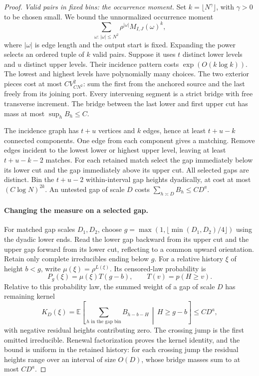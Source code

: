 \begin{proof}
\textit{Valid pairs in fixed bins: the occurrence moment.}
Set $k=\lfloor N^\gamma\rfloor$, with $\gamma>0$ to be chosen small.
We bound the unnormalized occurrence moment
\[
 \sum_{\omega:\,|\omega|\le N^2}
       \rho^{|\omega|}M_{I,J}(\omega)^k,
\]
where $|\omega|$ is edge length and the output start is fixed. Expanding
the power selects an ordered tuple of $k$ valid pairs. Suppose it uses
$t$ distinct lower levels and $u$ distinct upper levels. Their incidence
pattern costs $\exp(O(k\log k))$. The lowest and highest levels have
polynomially many choices. The two exterior pieces cost at most
$CV_{CN^2}^2$: sum the first from the anchored source and the last freely
from its joining port. Every intervening segment is a strict bridge with
free transverse increment. The bridge between the last lower and first
upper cut has mass at most $\sup_h B_h\le C$.

The incidence graph has $t+u$ vertices and $k$ edges, hence at least
$t+u-k$ connected components. One edge from each component gives a
matching. Remove edges incident to the lowest lower or highest upper
level, leaving at least $t+u-k-2$ matches. For each retained match select
the gap immediately below its lower cut and the gap immediately above
its upper cut. All selected gaps are distinct. Bin the $t+u-2$
within-interval gap heights dyadically, at cost at most
$(C\log N)^{2k}$. An untested gap of scale $D$ costs
$\sum_{h\asymp D}B_h\le CD^a$.

\paragraph{Changing the measure on a selected gap.}
For matched gap scales $D_1,D_2$, choose
$g=\max(1,\lfloor\min(D_1,D_2)/4\rfloor)$ using the dyadic lower
ends. Read the lower gap backward from its upper cut and the upper gap
forward from its lower cut, reflecting to a common upward orientation.
Retain only complete irreducibles ending below $g$. For a relative
history $\xi$ of height $b<g$, write $\mu(\xi)=\rho^{L(\xi)}$.
Its censored-law probability is
\[
 P_g(\xi)=\mu(\xi)T(g-b),\qquad T(v)=p(H\ge v).
\]
Relative to this probability law, the summed weight of a gap of scale
$D$ has remaining kernel
\[
 K_D(\xi)=\mathbb E\left[
       \sum_{h\text{ in the gap bin}}B_{h-b-H}
       \,\middle|\,H\ge g-b\right]\le CD^a,
\]
with negative residual heights contributing zero. The crossing jump is
the first omitted irreducible. Renewal factorization proves the kernel
identity, and the bound is uniform in the retained history: for each
crossing jump the residual heights range over an interval of size
$O(D)$, whose bridge masses sum to at most $CD^a$.


\end{proof}
